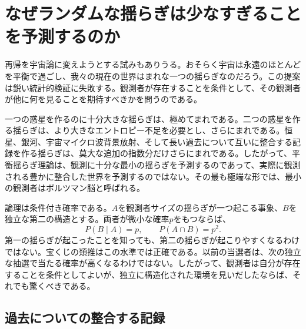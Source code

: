 \section{なぜランダムな揺らぎは少なすぎることを予測するのか}

再帰を宇宙論に変えようとする試みもありうる。おそらく宇宙は永遠のほとんどを平衡で過ごし、我々の現在の世界はまれな一つの揺らぎなのだろう。この提案は鋭い統計的検証に失敗する。観測者が存在することを条件として、その観測者が他に何を見ることを期待すべきかを問うのである。

一つの惑星を作るのに十分大きな揺らぎは、極めてまれである。二つの惑星を作る揺らぎは、より大きなエントロピー不足を必要とし、さらにまれである。恒星、銀河、宇宙マイクロ波背景放射、そして長い過去について互いに整合する記録を作る揺らぎは、莫大な追加の指数分だけさらにまれである。したがって、平衡揺らぎ理論は、観測に十分な最小の揺らぎを予測するのであって、実際に観測される豊かに整合した世界を予測するのではない。その最も極端な形では、最小の観測者はボルツマン脳と呼ばれる。

論理は条件付き確率である。\(A\)を観測者サイズの揺らぎが一つ起こる事象、\(B\)を独立な第二の構造とする。両者が微小な確率\(p\)をもつならば、
\begin{equation}
 P(B\mid A)=p,
 \qquad
 P(A\cap B)=p^2.
 \label{eq:sm8-conditional-fluctuations}
\end{equation}
第一の揺らぎが起こったことを知っても、第二の揺らぎが起こりやすくなるわけではない。宝くじの類推はこの水準では正確である。以前の当選者は、次の独立な抽選で当たる確率が高くなるわけではない。したがって、観測者は自分が存在することを条件としてよいが、独立に構造化された環境を見いだしたならば、それでも驚くべきである。

\begin{classroomqa}
\end{classroomqa}

\subsection{過去についての整合する記録}

